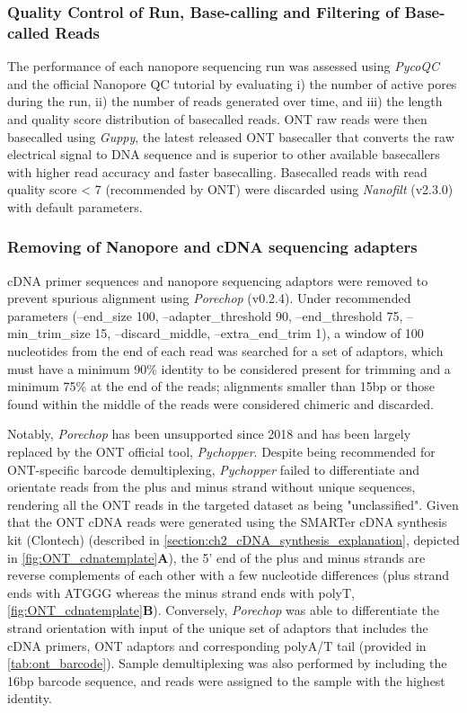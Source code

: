 \clearpage
\subsubsection{Quality Control of Run, Base-calling and Filtering of Base-called Reads}
The performance of each nanopore sequencing run was assessed using \textit{PycoQC}\cite{Leger2019} and the official Nanopore QC tutorial\cite{ONT2019NanoporeQC} by evaluating i) the number of active pores during the run, ii) the number of reads generated over time, and iii) the length and quality score distribution of basecalled reads. ONT raw reads were then basecalled using \textit{Guppy}, the latest released ONT basecaller that converts the raw electrical signal to DNA sequence and is superior to other available basecallers with higher read accuracy and faster basecalling\cite{Wick2019}. Basecalled reads with read quality score < 7 (recommended by ONT) were discarded using \textit{Nanofilt}\cite{DeCoster2018} (v2.3.0) with default parameters.

\subsubsection{Removing of Nanopore and cDNA sequencing adapters}
cDNA primer sequences and nanopore sequencing adaptors were removed to prevent spurious alignment using \textit{Porechop}\cite{Wick2017} (v0.2.4). Under recommended parameters (--end\_size 100, --adapter\_threshold 90, --end\_threshold 75, --min\_trim\_size 15, --discard\_middle, --extra\_end\_trim 1), a window of 100 nucleotides from the end of each read was searched for a set of adaptors, which must have a minimum 90\% identity to be considered present for trimming and a minimum 75\% at the end of the reads; alignments smaller than 15bp or those found within the middle of the reads were considered chimeric and discarded. 

Notably, \textit{Porechop} has been unsupported since 2018 and has been largely replaced by the ONT official tool, \textit{Pychopper}\cite{OxfordNanoporePychopper}. Despite being recommended for ONT-specific barcode demultiplexing, \textit{Pychopper} failed to differentiate and orientate reads from the plus and minus strand without unique sequences, rendering all the ONT reads in the targeted dataset as being "unclassified". Given that the ONT cDNA reads were generated using the SMARTer cDNA synthesis kit (Clontech) (described in \cref{section:ch2_cDNA_synthesis_explanation}, depicted in \cref{fig:ONT_cdnatemplate}\textbf{A}), the 5’ end of the plus and minus strands are reverse complements of each other with a few nucleotide differences (plus strand ends with ATGGG whereas the minus strand ends with polyT, \cref{fig:ONT_cdnatemplate}\textbf{B}). Conversely, \textit{Porechop} was able to differentiate the strand orientation with input of the unique set of adaptors that includes the cDNA primers, ONT adaptors and corresponding polyA/T tail (provided in \cref{tab:ont_barcode}). Sample demultiplexing was also performed by including the 16bp barcode sequence, and reads were assigned to the sample with the highest identity. 

